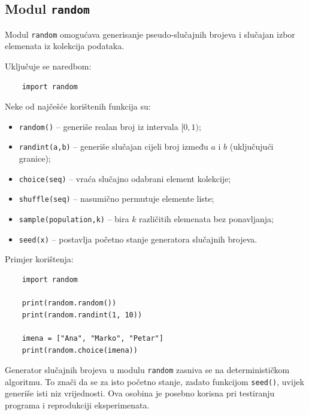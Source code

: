\subsection{Modul \texttt{random}}

Modul \texttt{random} omogućava generisanje pseudo-slučajnih brojeva i slučajan izbor elemenata iz kolekcija podataka.

Uključuje se naredbom:

\begin{verbatim}
	import random
\end{verbatim}

Neke od najčešće korištenih funkcija su:

\begin{itemize}
	\item \texttt{random()} -- generiše realan broj iz intervala $[0,1)$;
	\item \texttt{randint(a,b)} -- generiše slučajan cijeli broj između $a$ i $b$ (uključujući granice);
	\item \texttt{choice(seq)} -- vraća slučajno odabrani element kolekcije;
	\item \texttt{shuffle(seq)} -- nasumično permutuje elemente liste;
	\item \texttt{sample(population,k)} -- bira $k$ različitih elemenata bez ponavljanja;
	\item \texttt{seed(x)} -- postavlja početno stanje generatora slučajnih brojeva.
\end{itemize}

Primjer korištenja:

\begin{verbatim}
	import random
	
	print(random.random())
	print(random.randint(1, 10))
	
	imena = ["Ana", "Marko", "Petar"]
	print(random.choice(imena))
\end{verbatim}

Generator slučajnih brojeva u modulu \texttt{random} zasniva se na determinističkom algoritmu. To znači da se za isto početno stanje, zadato funkcijom \texttt{seed()}, uvijek generiše isti niz vrijednosti. Ova osobina je posebno korisna pri testiranju programa i reprodukciji eksperimenata.



